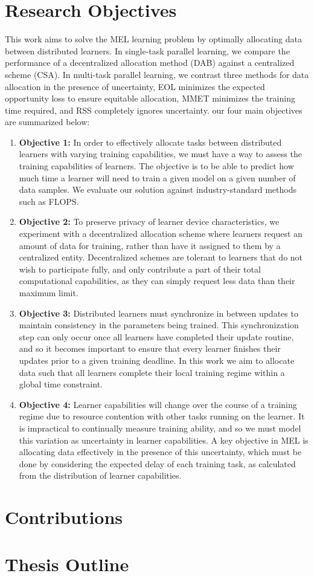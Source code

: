 \documentclass{article}
\begin{document}
\section{Research Objectives}

This work aims to solve the MEL learning problem by optimally allocating data between distributed learners. In single-task parallel learning, we compare the performance of a decentralized allocation method (DAB) against a centralized scheme (CSA). In multi-task parallel learning, we contrast three methods for data allocation in the presence of uncertainty, EOL minimizes the expected opportunity loss to ensure equitable allocation, MMET minimizes the training time required, and RSS completely ignores uncertainty. our four main objectives are summarized below:

\begin{enumerate}
  \item \textbf{Objective 1:} In order to effectively allocate tasks between distributed learners with varying training capabilities, we must have a way to assess the training capabilities of learners. The objective is to be able to predict how much time a learner will need to train a given model on a given number of data samples. We evaluate our solution against industry-standard methods such as FLOPS.
      
  \item \textbf{Objective 2:} To preserve privacy of learner device characteristics, we experiment with a decentralized allocation scheme where learners request an amount of data for training, rather than have it assigned to them by a centralized entity. Decentralized schemes are tolerant to learners that do not wish to participate fully, and only contribute a part of their total computational capabilities, as they can simply request less data than their maximum limit.
  
  \item \textbf{Objective 3:} Distributed learners must synchronize in between updates to maintain consistency in the parameters being trained. This synchronization step can only occur once all learners have completed their update routine, and so it becomes important to ensure that every learner finishes their updates prior to a given training deadline. In this work we aim to allocate data such that all learners complete their local training regime within a global time constraint.
  
  \item \textbf{Objective 4:} Learner capabilities will change over the course of a training regime due to resource contention with other tasks running on the learner. It is impractical to continually measure training ability, and so we must model this variation as uncertainty in learner capabilities. A key objective in MEL is allocating data effectively in the presence of this uncertainty, which must be done by considering the expected delay of each training task, as calculated from the distribution of learner capabilities.
      
\end{enumerate}

\section{Contributions}

\section{Thesis Outline}
\end{document}
